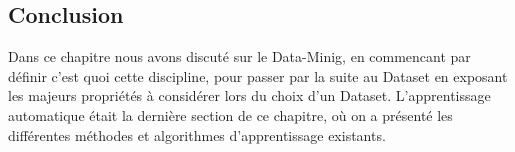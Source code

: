 \subsection{Conclusion}
Dans ce chapitre nous avons discuté sur le Data-Minig, en commencant par définir c'est quoi cette discipline, pour passer par la suite au Dataset en exposant les majeurs propriétés à considérer lors du choix d'un Dataset. L'apprentissage automatique était la dernière section de ce chapitre, où on a présenté les différentes méthodes et algorithmes d'apprentissage existants. 